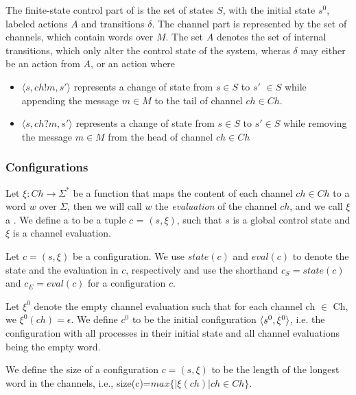 The finite-state control part of  is the set of states $S$, with the initial state $s^0$, labeled actions $A$ and transitions $\delta$. The channel part is represented by the set  of channels, which contain words over $M$. The set $A$ denotes the set of internal transitions, which only alter the control state of the system, wheras $\delta$ may either be an action from $A$, or an action where

\begin{itemize}
\item[]
$\langle s, ch!m, s'\rangle$ represents a change of state from $s \in S$ to $s'$ $\in S$ while appending the message $m\in M$ to the tail of channel $ch\in Ch$.
\item[]
$\langle s, ch?m, s'\rangle$ represents a change of state from $s\in S$ to $s'\in S$ while removing the message $m\in M$ from the head of channel $ch \in Ch$
\end{itemize}



\subsubsection{Configurations}
Let $\xi : Ch \rightarrow \Sigma^*$ be a function that maps the content of each channel $ch \in Ch$ to a word $w$ over $\Sigma$, then we will call $w$ the \emph{evaluation} of the channel $ch$, and we call $\xi$ a . We define a  to be a tuple $c$ = $(s, \xi)$, such that $s$ is a global control state and $\xi$ is a channel evaluation.

Let $c=(s,\xi)$ be a configuration. We use $state(c)$ and $eval(c)$  to denote the state and the evaluation in $c$, respectively and use the shorthand $c_{S} = state(c)$ and $c_{E} = eval(c)$ for a configuration $c$.

Let $\xi^0$ denote the empty channel evaluation such that for each channel ch $\in$ Ch, we $\xi^0(ch)=\epsilon$. We define $c^0$ to be the initial configuration $\langle s^0, \xi^0\rangle$, i.e. the configuration with all processes in their initial state and all channel evaluations being the empty word.

We define the size of a configuration $c = (s,\xi)$ to be the length of the longest word in the channels, i.e., size(c)=$max\{|\xi(ch)| ch \in Ch\}$.


